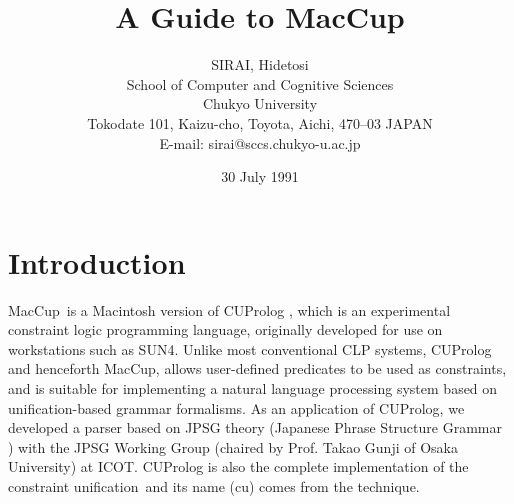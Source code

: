 \setlength{\textwidth}{6.5in}
\setlength{\textheight}{8.5in}
\setlength{\topmargin}{-.5in}
\setlength{\evensidemargin}{0in}
\setlength{\oddsidemargin}{0in}

\newtheorem{defs}{[Def]}
\newtheorem{ex}{Example}
\newtheorem{thm}{Theorem}
\newcommand{\cuprolog}{{\sf MacCup}}
\newcommand{\normalskip}{\baselineskip=1.3\normalbaselineskip}
\newcommand{\programskip}{\baselineskip=0.8\normalbaselineskip}
\newcommand{\bcapt}{\small \sf }
\newcommand{\ecapt}{\rm  \normalsize }
\newcommand{\inputprog}[1]{
	\footnotesize
	\programskip
	
	\normalsize
	\normalskip
}


\normalskip

\title{A Guide to MacCup}
\author{
SIRAI, Hidetosi\\
	School of Computer and Cognitive Sciences\\
        Chukyo University\\
        Tokodate 101, Kaizu-cho, Toyota, Aichi, 470--03 JAPAN\\
	E-mail: sirai@sccs.chukyo-u.ac.jp\\
}
\date{30 July 1991}
\maketitle

\tableofcontents
\newpage

\section{Introduction}
 \cuprolog\ is a Macintosh version of {\sf CUProlog}
\cite{tuda:lpc,tuda:acl}, which is an experimental constraint logic
programming language, originally developed for use on workstations such as
SUN4.  Unlike most conventional CLP systems, {\sf CUProlog} and
henceforth \cuprolog, allows user-defined predicates to be used as
constraints, and is suitable for implementing a natural language
processing system based on unification-based grammar formalisms\cite{shi:ub}.
As an application of {\sf CUProlog}, we developed a parser based on JPSG
theory (Japanese Phrase Structure Grammar \cite{gun:jpsg}) with the JPSG
Working Group (chaired by Prof. Takao Gunji of Osaka University)
at ICOT.  {\sf CUProlog} is also the complete implementation of the
constraint unification\cite{cs:cu}\ and its name (cu) comes from the
technique.

